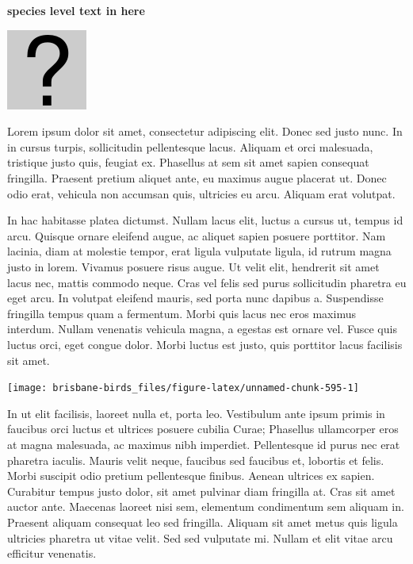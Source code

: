\documentclass[]{book}
\let\origfigure\figure
\let\endorigfigure\endfigure
\renewenvironment{figure}[1][2] {
  \expandafter\origfigure\expandafter[H]
} {
  \endorigfigure
}
\begin{document}
\textbf{species level text in here}

\begin{figure}
\centering
\includegraphics{assets/missing.png}
\caption{No image for species}
\end{figure}

Lorem ipsum dolor sit amet, consectetur adipiscing elit. Donec sed justo
nunc. In in cursus turpis, sollicitudin pellentesque lacus. Aliquam et
orci malesuada, tristique justo quis, feugiat ex. Phasellus at sem sit
amet sapien consequat fringilla. Praesent pretium aliquet ante, eu
maximus augue placerat ut. Donec odio erat, vehicula non accumsan quis,
ultricies eu arcu. Aliquam erat volutpat.

In hac habitasse platea dictumst. Nullam lacus elit, luctus a cursus ut,
tempus id arcu. Quisque ornare eleifend augue, ac aliquet sapien posuere
porttitor. Nam lacinia, diam at molestie tempor, erat ligula vulputate
ligula, id rutrum magna justo in lorem. Vivamus posuere risus augue. Ut
velit elit, hendrerit sit amet lacus nec, mattis commodo neque. Cras vel
felis sed purus sollicitudin pharetra eu eget arcu. In volutpat eleifend
mauris, sed porta nunc dapibus a. Suspendisse fringilla tempus quam a
fermentum. Morbi quis lacus nec eros maximus interdum. Nullam venenatis
vehicula magna, a egestas est ornare vel. Fusce quis luctus orci, eget
congue dolor. Morbi luctus est justo, quis porttitor lacus facilisis sit
amet.

\begin{figure}
\texttt{[image: brisbane-birds\_files/figure-latex/unnamed-chunk-595-1]} \caption{insert figure caption}\label{fig:unnamed-chunk-595}
\end{figure}

In ut elit facilisis, laoreet nulla et, porta leo. Vestibulum ante ipsum
primis in faucibus orci luctus et ultrices posuere cubilia Curae;
Phasellus ullamcorper eros at magna malesuada, ac maximus nibh
imperdiet. Pellentesque id purus nec erat pharetra iaculis. Mauris velit
neque, faucibus sed faucibus et, lobortis et felis. Morbi suscipit odio
pretium pellentesque finibus. Aenean ultrices ex sapien. Curabitur
tempus justo dolor, sit amet pulvinar diam fringilla at. Cras sit amet
auctor ante. Maecenas laoreet nisi sem, elementum condimentum sem
aliquam in. Praesent aliquam consequat leo sed fringilla. Aliquam sit
amet metus quis ligula ultricies pharetra ut vitae velit. Sed sed
vulputate mi. Nullam et elit vitae arcu efficitur venenatis.
\end{document}
